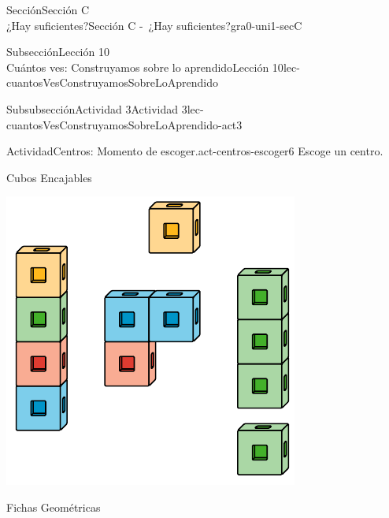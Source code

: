 \begin{sectionptx}{Sección}{{\Large Sección C\\}¿Hay suficientes?}{}{Sección C -~¿Hay suficientes?}{}{}{gra0-uni1-secC}
\begin{subsectionptx}{Subsección}{{\normalsize Lección 10\\[-0.05cm]}Cuántos ves: Construyamos sobre lo aprendido}{}{Lección 10}{}{}{lec-cuantosVesConstruyamosSobreLoAprendido}
\begin{subsubsectionptx}{Subsubsección}{Actividad 3}{}{Actividad 3}{}{}{lec-cuantosVesConstruyamosSobreLoAprendido-act3}
\begin{activity}{Actividad}{Centros: Momento de escoger.}{act-centros-escoger6}
Escoge un centro.%
\begin{sidebyside}{2}{0.025}{0.025}{0.05}%
\begin{sbspanel}{0.45}%
Cubos Encajables%
\par
\includegraphics[max width=\linewidth, center]{external/svg-source/tikz-file-128850.pdf}
\end{sbspanel}%
\begin{sbspanel}{0.45}%
Fichas Geométricas%
\par

\end{sbspanel}
\end{sidebyside}
\end{activity}
\end{subsubsectionptx}
\end{subsectionptx}
\end{sectionptx}
